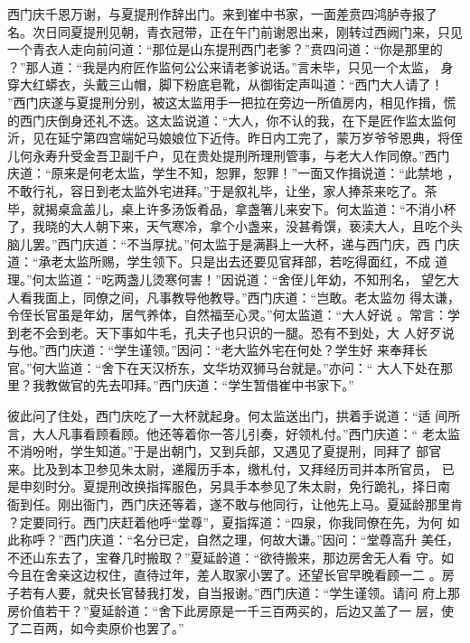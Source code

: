 西门庆千恩万谢，与夏提刑作辞出门。来到崔中书家，一面差贲四鸿胪寺报了
名。次日同夏提刑见朝，青衣冠带，正在午门前谢恩出来，刚转过西阙门来，只见
一个青衣人走向前问道：“那位是山东提刑西门老爹？”贲四问道：“你是那里的
？”那人道：“我是内府匠作监何公公来请老爹说话。”言未毕，只见一个太监，
身穿大红蟒衣，头戴三山帽，脚下粉底皂靴，从御街定声叫道：“西门大人请了！
”西门庆遂与夏提刑分别，被这太监用手一把拉在旁边一所值房内，相见作揖，慌
的西门庆倒身还礼不迭。这太监说道：“大人，你不认的我，在下是匠作监太监何
沂，见在延宁第四宫端妃马娘娘位下近侍。昨日内工完了，蒙万岁爷爷恩典，将侄
儿何永寿升受金吾卫副千户，见在贵处提刑所理刑管事，与老大人作同僚。”西门
庆道：“原来是何老太监，学生不知，恕罪，恕罪！”一面又作揖说道：“此禁地
，不敢行礼，容日到老太监外宅进拜。”于是叙礼毕，让坐，家人捧茶来吃了。茶
毕，就揭桌盒盖儿，桌上许多汤饭肴品，拿盏箸儿来安下。何太监道：“不消小杯
了，我晓的大人朝下来，天气寒冷，拿个小盏来，没甚肴馔，亵渎大人，且吃个头
脑儿罢。”西门庆道：“不当厚扰。”何太监于是满斟上一大杯，递与西门庆，西
门庆道：“承老太监所赐，学生领下。只是出去还要见官拜部，若吃得面红，不成
道理。”何太监道：“吃两盏儿烫寒何害！”因说道：“舍侄儿年幼，不知刑名，
望乞大人看我面上，同僚之间，凡事教导他教导。”西门庆道：“岂敢。老太监勿
得太谦，令侄长官虽是年幼，居气养体，自然福至心灵。”何太监道：“大人好说
。常言：学到老不会到老。天下事如牛毛，孔夫子也只识的一腿。恐有不到处，大
人好歹说与他。”西门庆道：“学生谨领。”因问：“老大监外宅在何处？学生好
来奉拜长官。”何大监道：“舍下在天汉桥东，文华坊双狮马台就是。”亦问：“
大人下处在那里？我教做官的先去叩拜。”西门庆道：“学生暂借崔中书家下。”

彼此问了住处，西门庆吃了一大杯就起身。何太监送出门，拱着手说道：“适
间所言，大人凡事看顾看顾。他还等着你一答儿引奏，好领札付。”西门庆道：“
老太监不消吩咐，学生知道。”于是出朝门，又到兵部，又遇见了夏提刑，同拜了
部官来。比及到本卫参见朱太尉，递履历手本，缴札付，又拜经历司并本所官员，
已是申刻时分。夏提刑改换指挥服色，另具手本参见了朱太尉，免行跪礼，择日南
衙到任。刚出衙门，西门庆还等着，遂不敢与他同行，让他先上马。夏延龄那里肯
？定要同行。西门庆赶着他呼“堂尊”，夏指挥道：“四泉，你我同僚在先，为何
如此称呼？”西门庆道：“名分已定，自然之理，何故大谦。”因问：“堂尊高升
美任，不还山东去了，宝眷几时搬取？”夏延龄道：“欲待搬来，那边房舍无人看
守。如今且在舍亲这边权住，直待过年，差人取家小罢了。还望长官早晚看顾一二
。房子若有人要，就央长官替我打发，自当报谢。”西门庆道：“学生谨领。请问
府上那房价值若干？”夏延龄道：“舍下此房原是一千三百两买的，后边又盖了一
层，使了二百两，如今卖原价也罢了。”

